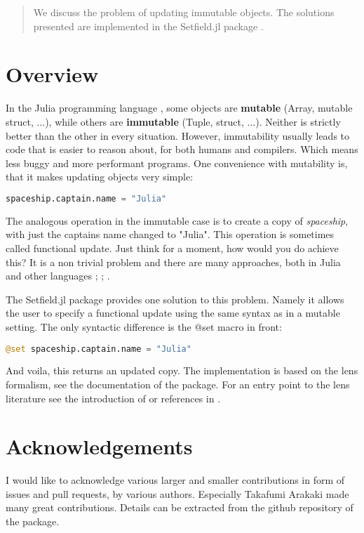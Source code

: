 \documentclass{juliacon}
\begin{document}


\maketitle

\begin{abstract}

    We discuss the problem of updating immutable objects. The solutions presented are implemented in the Setfield.jl package \cite{SetfieldPackage}.

\end{abstract}

\section{Overview}

In the Julia programming language \cite{Julia-2017}, some objects are \textbf{mutable} (Array, mutable struct, ...), while others are \textbf{immutable} (Tuple, struct, ...).
Neither is strictly better than the other in every situation. However, immutability usually leads to code that is easier to reason about, for both humans and compilers.
Which means less buggy and more performant programs.
One convenience with mutability is, that it makes updating objects very simple:

\begin{lstlisting}[language = Julia]
spaceship.captain.name = "Julia"
\end{lstlisting}

The analogous operation in the immutable case is to create a copy of \textit{spaceship},
with just the captains name changed to "Julia". This operation is sometimes called functional update.
Just think for a moment, how would you do achieve this?
It is a non trivial problem and there are many approaches, both in Julia \cite{JuliaPR21912} and other languages \cite{HaskellLens}; \cite{ClojureSpecter}; \cite{ImmutableJS}.

The Setfield.jl package \cite{SetfieldPackage} provides one solution to this problem. Namely it allows the user
to specify a functional update using the same syntax as in a mutable setting. The only syntactic difference is the @set macro in front:

\begin{lstlisting}[language = Julia]
@set spaceship.captain.name = "Julia"
\end{lstlisting}

And voila, this returns an updated copy. The implementation is based on the lens formalism,
see the documentation of the package. For an entry point to the lens literature see the introduction of \cite{AlgebrasAndUpdateStrategies} or references in \cite{riley2018categories}.

\section{Acknowledgements}

I would like to acknowledge various larger and smaller contributions in form of issues and pull requests, by various authors. Especially Takafumi Arakaki made many great contributions. Details can be extracted from the github repository of the package.



\end{document}
